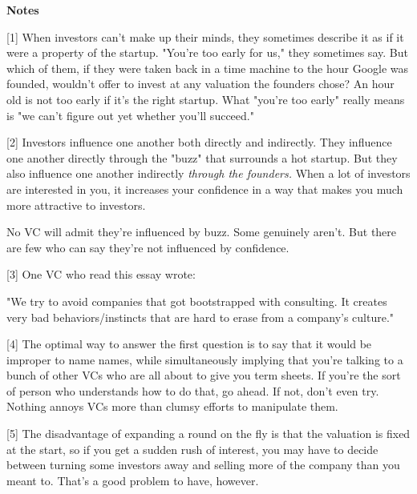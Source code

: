 \textbf{Notes}

[1] When investors can't make up their minds, they sometimes
                  describe it as if it were a property of the startup. "You're
                  too early for us," they sometimes say. But which of them, if
                  they were taken back in a time machine to the hour Google was
                  founded, wouldn't offer to invest at any valuation the
                  founders chose? An hour old is not too early if it's the right
                  startup. What "you're too early" really means is "we can't
                  figure out yet whether you'll succeed."


                  [2] Investors influence one another both directly and
                  indirectly. They influence one another directly through the
                  "buzz" that surrounds a hot startup. But they also influence
                  one another indirectly \emph{through the founders.} When a lot
                  of investors are interested in you, it increases your
                  confidence in a way that makes you much more attractive to
                  investors.

No VC will admit they're influenced by
                  buzz. Some genuinely aren't. But there are few who can say
                  they're not influenced by confidence.

[3] One VC who read this essay wrote:

"We try to
                  avoid companies that got bootstrapped with consulting. It
                  creates very bad behaviors/instincts that are hard to erase
                  from a company's culture."

[4] The optimal way to answer the first question is to say that
                  it would be improper to name names, while simultaneously
                  implying that you're talking to a bunch of other VCs who are
                  all about to give you term sheets. If you're the sort of
                  person who understands how to do that, go ahead. If not, don't
                  even try. Nothing annoys VCs more than clumsy efforts to
                  manipulate them.

[5] The disadvantage of expanding a round on the fly is that
                  the valuation is fixed at the start, so if you get a sudden
                  rush of interest, you may have to decide between turning some
                  investors away and selling more of the company than you meant
                  to. That's a good problem to have, however.

